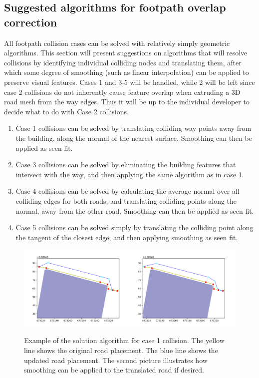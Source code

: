 \documentclass{kththesis}
\begin{document}
\subsection{Suggested algorithms for footpath overlap correction}

All footpath collision cases can be solved with relatively simply geometric algorithms. This section will present suggestions on algorithms that will resolve collisions by identifying individual colliding nodes and translating them, after which some degree of smoothing (such as linear interpolation) can be applied to preserve visual features. Cases 1 and 3-5 will be handled, while 2 will be left since case 2 collisions do not inherently cause feature overlap when extruding a 3D road mesh from the way edges. Thus it will be up to the individual developer to decide what to do with Case 2 collisions.

\begin{enumerate}
\item Case 1 collisions can be solved by translating colliding way points away from the building, along the normal of the nearest surface. Smoothing can then be applied as seen fit.
\item Case 3 collisions can be solved by eliminating the building features that intersect with the way, and then applying the same algorithm as in case 1.
\item Case 4 collisions can be solved by calculating the average normal over all colliding edges for both roads, and translating colliding points along the normal, away from the other road. Smoothing can then be applied as seen fit.
\item Case 5 collisions can be solved simply by translating the colliding point along the tangent of the closest edge, and then applying smoothing as seen fit.
\end{enumerate}

\begin{figure}[H]
    \centering
    \includegraphics[width=\textwidth,height=0.5\textheight,keepaspectratio]{img_feature_overlap_fix_1}
    \label{fig:collision-case-1}
    \caption{Example of the solution algorithm for case 1 collision. The yellow line shows the original road placement. The blue line shows the updated road placement. The second picture illustrates how smoothing can be applied to the translated road if desired.}
\end{figure}
\end{document}
